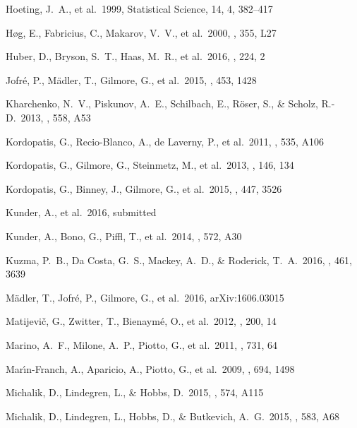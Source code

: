 \documentclass[preprint]{aastex}
\begin{document}
\begin{thebibliography}{dummy}
 Hoeting, J.~A., et al.\ 1999, Statistical Science, 14, 4, 382--417

 H{\o}g, E., Fabricius, C., Makarov, V.~V., et al.\ 2000, \aap, 355, L27 

 Huber, D., Bryson, S.~T., Haas, M.~R., et al.\ 2016, \apjs, 224, 2 

 Jofr{\'e}, P., M{\"a}dler, T., Gilmore, G., et al.\ 2015, \mnras, 453, 1428 

 Kharchenko, N.~V., Piskunov, A.~E., Schilbach, E., R{\"o}ser, S., \& Scholz, R.-D.\ 2013, \aap, 558, A53 

 Kordopatis, G., Recio-Blanco, A., de Laverny, P., et al.\ 2011, \aap, 535, A106 

 Kordopatis, G., Gilmore, G., Steinmetz, M., et al.\ 2013, \aj, 146, 134 

 Kordopatis, G., Binney, J., Gilmore, G., et al.\ 2015, \mnras, 447, 3526 

 Kunder, A., et al.\ 2016, submitted

 Kunder, A., Bono, G., Piffl, T., et al.\ 2014, \aap, 572, A30 

 Kuzma, P.~B., Da Costa, G.~S., Mackey, A.~D., \& Roderick, T.~A.\ 2016, \mnras, 461, 3639 

 M{\"a}dler, T., Jofr{\'e}, P., Gilmore, G., et al.\ 2016, arXiv:1606.03015 

 Matijevi{\v c}, G., Zwitter, T., Bienaym{\'e}, O., et al.\ 2012, \apjs, 200, 14 

 Marino, A.~F., Milone, A.~P., Piotto, G., et al.\ 2011, \apj, 731, 64 

 Mar{\'{\i}}n-Franch, A., Aparicio, A., Piotto, G., et al.\ 2009, \apj, 694, 1498 

 Michalik, D., Lindegren, L., \& Hobbs, D.\ 2015, \aap, 574, A115 

 Michalik, D., Lindegren, L., Hobbs, D., \& Butkevich, A.~G.\ 2015, \aap, 583, A68 


\end{thebibliography}
\end{document}
